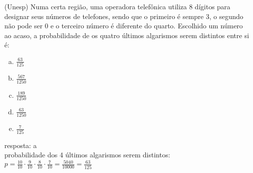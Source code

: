 \begin{ex}
  (Unesp) Numa certa região, uma operadora telefônica utiliza 8 dígitos para designar seus números de telefones, sendo que o primeiro é sempre 3, o segundo não pode ser 0 e o terceiro número é diferente do quarto. Escolhido um número ao acaso, a probabilidade de os quatro últimos algarismos serem distintos entre si é:
    \begin{enumerate}  [(a)]
        \item $\frac{63}{125}$
        \item $\frac{567}{1250}$
        \item $\frac{189}{1250}$
        \item $\frac{63}{1250}$
        \item $\frac{7}{125}$
    \end{enumerate}
    \begin{sol}
     resposta: a \\
     probabilidade dos 4 últimos algarismos serem distintos: \\
     $p=\frac{10}{10}\cdot\frac{9}{10}\cdot\frac{8}{10}\cdot\frac{7}{10}=\frac{5040}{10000}=\frac{63}{125}$
    \end{sol}
 \end{ex}